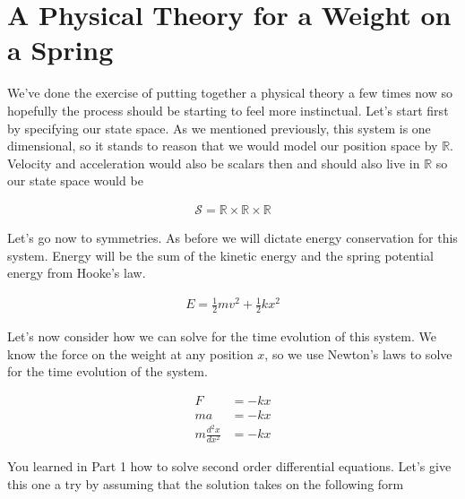 \documentclass[book.tex]{subfiles}
\begin{document}
\section{A Physical Theory for a Weight on a Spring}

We've done the exercise of putting together a physical theory a few times now so hopefully the process should be starting to feel more instinctual. Let's start first by specifying our state space. As we mentioned previously, this system is one dimensional, so it stands to reason that we would model our position space by $\mathbb{R}$. Velocity and acceleration would also be scalars then and should also live in $\mathbb{R}$ so our state space would be

\begin{align}
    \mathcal{S} = \mathbb{R} \times \mathbb{R} \times \mathbb{R}
\end{align}

Let's go now to symmetries. As before we will dictate energy conservation for this system. Energy will be the sum of the kinetic energy and the spring potential energy from Hooke's law.

\begin{align}
    E = \frac{1}{2}mv^2 + \frac{1}{2}k x^2
\end{align}

Let's now consider how we can solve for the time evolution of this system. We know the force on the weight at any position $x$, so we use Newton's laws to solve for the time evolution of the system.

\begin{align}
    F &= - k x \\
    m a &= -k x \\
    m \frac{d^2x}{dx^2} &= - k x
\end{align}

You learned in Part 1 how to solve second order differential equations. Let's give this one a try by assuming that the solution takes on the following form
\end{document}
